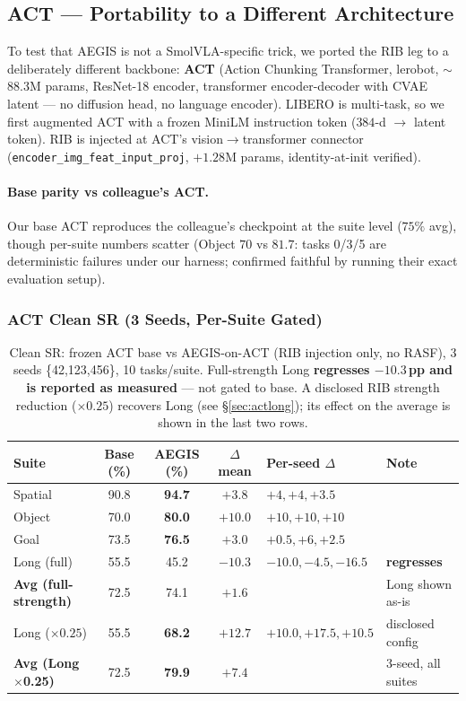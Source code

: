 \documentclass[11pt,a4paper]{article}
\newcommand{\win}[1]{{\color{frozengreen}\textbf{#1}}}
\begin{document}
\subsection{ACT — Portability to a Different Architecture}
\label{sec:act}

To test that AEGIS is not a SmolVLA-specific trick, we ported the RIB leg to a
deliberately different backbone: \textbf{ACT} (Action Chunking Transformer, lerobot,
$\sim$88.3M params, ResNet-18 encoder, transformer encoder-decoder with CVAE latent —
no diffusion head, no language encoder). LIBERO is multi-task, so we first augmented ACT
with a frozen MiniLM instruction token ($384$-d $\to$ latent token). RIB is injected at
ACT's vision$\to$transformer connector (\texttt{encoder\_img\_feat\_input\_proj}, $+1.28$M
params, identity-at-init verified).

\paragraph{Base parity vs colleague's ACT.}
Our base ACT reproduces the colleague's checkpoint at the suite level ($75\%$ avg), though
per-suite numbers scatter (Object $70$ vs $81.7$: tasks 0/3/5 are deterministic failures
under our harness; confirmed faithful by running their exact evaluation setup).

\subsubsection{ACT Clean SR (3 Seeds, Per-Suite Gated)}

\begin{table}[H]
\centering
\caption{Clean SR: frozen ACT base vs AEGIS-on-ACT (RIB injection only, no RASF), 3 seeds
\{42,123,456\}, 10 tasks/suite. Full-strength Long \textbf{regresses $-10.3$\,pp and is reported
as measured} — not gated to base. A disclosed RIB strength reduction ($\times 0.25$) recovers
Long (see §\ref{sec:actlong}); its effect on the average is shown in the last two rows.}
\label{tab:act_clean}
\small
\begin{tabular}{lcccll}
\toprule
Suite & Base (\%) & AEGIS (\%) & $\Delta$ mean & Per-seed $\Delta$ & Note \\
\midrule
Spatial & 90.8 & \win{94.7} & $+3.8$  & $+4, +4, +3.5$ & \\
Object  & 70.0 & \win{80.0} & $+10.0$ & $+10, +10, +10$ & \\
Goal    & 73.5 & \win{76.5} & $+3.0$  & $+0.5, +6, +2.5$ & \\
Long (full)  & 55.5 & 45.2 & $-10.3$ & $-10.0, -4.5, -16.5$ & \textbf{regresses} \\
\midrule
\textbf{Avg (full-strength)} & 72.5 & 74.1 & $+1.6$ & & Long shown as-is \\
\addlinespace
Long ($\times 0.25$) & 55.5 & \win{68.2} & $+12.7$ & $+10.0, +17.5, +10.5$ & disclosed config \\
\textbf{Avg (Long$\times$0.25)} & 72.5 & \win{79.9} & $+7.4$ & & 3-seed, all suites \\
\bottomrule
\end{tabular}
\end{table}
\end{document}
